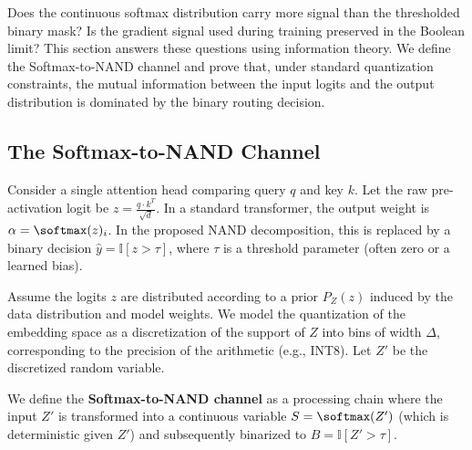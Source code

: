 Does the continuous softmax distribution carry more signal than the thresholded binary mask? Is the gradient signal used during training preserved in the Boolean limit? This section answers these questions using information theory. We define the Softmax-to-NAND channel and prove that, under standard quantization constraints, the mutual information between the input logits and the output distribution is dominated by the binary routing decision.













\subsection{The Softmax-to-NAND Channel}






Consider a single attention head comparing query $q$ and key $k$. Let the raw pre-activation logit be $z = \frac{q \cdot k^T}{\sqrt{d}}$. In a standard transformer, the output weight is $\alpha = \softmax(z)_i$. In the proposed NAND decomposition, this is replaced by a binary decision $\hat{y} = \mathbb{I}[z > \tau]$, where $\tau$ is a threshold parameter (often zero or a learned bias).













Assume the logits $z$ are distributed according to a prior $P_Z(z)$ induced by the data distribution and model weights. We model the quantization of the embedding space as a discretization of the support of $Z$ into bins of width $\Delta$, corresponding to the precision of the arithmetic (e.g., INT8). Let $Z'$ be the discretized random variable.













We define the \textbf{Softmax-to-NAND channel} as a processing chain where the input $Z'$ is transformed into a continuous variable $S = \softmax(Z')$ (which is deterministic given $Z'$) and subsequently binarized to $B = \mathbb{I}[Z' > \tau]$.













